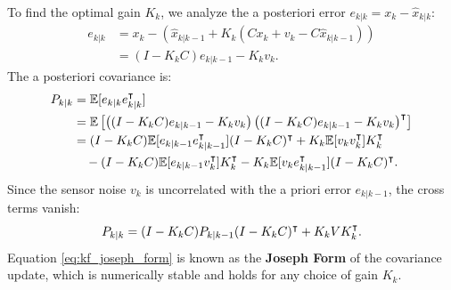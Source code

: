 To find the optimal gain $K_k$, we analyze the a posteriori error $e_{k|k} = x_k - \hat{x}_{k|k}$:
\begin{align}
    e_{k|k} &= x_k - \left( \hat{x}_{k|k-1} + K_k (C x_k + v_k - C \hat{x}_{k|k-1}) \right) \nonumber \\
&= (I - K_k C) e_{k|k-1} - K_k v_k .
\end{align}
The a posteriori covariance is:
\begin{align}
    P_{k|k} &= \mathbb{E}[e_{k|k} e_{k|k}^\intercal] \nonumber \\
    &= \mathbb{E}\left[ \left( (I - K_k C) e_{k|k-1} - K_k v_k \right) \left( (I - K_k C) e_{k|k-1} - K_k v_k \right)^\intercal \right] \nonumber \\
    &= (I - K_k C) \mathbb{E}[e_{k|k-1} e_{k|k-1}^\intercal] (I - K_k C)^\intercal + K_k \mathbb{E}[v_k v_k^\intercal] K_k^\intercal \nonumber \\
&\quad - (I - K_k C) \mathbb{E}[e_{k|k-1} v_k^\intercal] K_k^\intercal - K_k \mathbb{E}[v_k e_{k|k-1}^\intercal] (I - K_k C)^\intercal .
\end{align}
Since the sensor noise $v_k$ is uncorrelated with the a priori error $e_{k|k-1}$, the cross terms vanish:
\begin{equation}
    P_{k|k} = (I - K_k C) P_{k|k-1} (I - K_k C)^\intercal + K_k V K_k^\intercal . \label{eq:kf_joseph_form}
\end{equation}
Equation \eqref{eq:kf_joseph_form} is known as the \textbf{Joseph Form} of the covariance update, which is numerically stable and holds for any choice of gain $K_k$.


